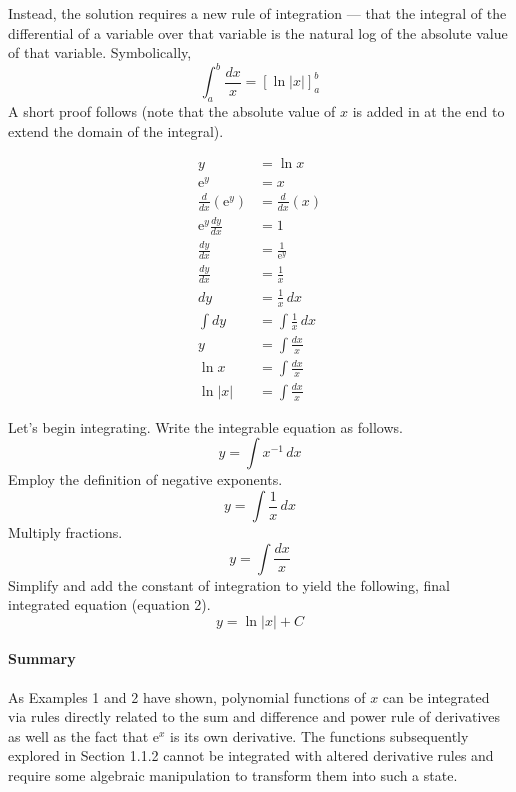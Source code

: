 \documentclass{article}
\begin{document}
Instead, the solution requires a new rule of integration --- that the integral of the differential of a variable over that variable is the natural log of the absolute value of that variable. Symbolically,$$\int_a^b \frac{dx}{x}=\left[\ln|x|\right]_a^b$$A short proof follows (note that the absolute value of $x$ is added in at the end to extend the domain of the integral).\par
\begin{align*}
    y &= \ln x\\
    \text{e}^y &= x\\
    \frac{d}{dx}\left(\text{e}^y\right) &= \frac{d}{dx}\left(x\right)\\
    \text{e}^y\frac{dy}{dx} &= 1\\
    \frac{dy}{dx} &= \frac{1}{\text{e}^y}\\
    \frac{dy}{dx} &= \frac{1}{x}\\
    dy &= \frac{1}{x}\, dx\\
    \int dy &= \int \frac{1}{x}\, dx\\
    y &= \int \frac{dx}{x}\\
    \ln x &= \int \frac{dx}{x}\\
    \ln |x| &= \int \frac{dx}{x}
\end{align*}\par
Let's begin integrating. Write the integrable equation as follows.
\begin{equation*}
    y=\int x^{-1}\, dx
\end{equation*}
Employ the definition of negative exponents.
\begin{equation*}
    y=\int \frac{1}{x}\, dx
\end{equation*}
Multiply fractions.
\begin{equation*}
    y=\int \frac{dx}{x}
\end{equation*}
Simplify and add the constant of integration to yield the following, final integrated equation (equation 2).
\begin{equation}
    y=\ln |x|+C
\end{equation}
\paragraph{Summary} As Examples 1 and 2 have shown, polynomial functions of $x$ can be integrated via rules directly related to the sum and difference and power rule of derivatives as well as the fact that $\text{e}^x$ is its own derivative. The functions subsequently explored in Section 1.1.2 cannot be integrated with altered derivative rules and require some algebraic manipulation to transform them into such a state.
\newpage
\end{document}
